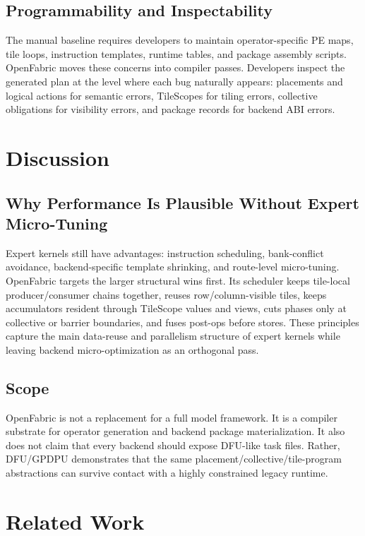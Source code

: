 \documentclass[conference]{IEEEtran}
\newcommand{\systemname}{OpenFabric}
\newcommand{\targetbackend}{DFU/GPDPU}
\begin{document}
\subsection{Programmability and Inspectability}

The manual baseline requires developers to maintain operator-specific PE maps,
tile loops, instruction templates, runtime tables, and package assembly scripts.
\systemname{} moves these concerns into compiler passes. Developers inspect the
generated plan at the level where each bug naturally appears: placements and
logical actions for semantic errors, TileScopes for tiling errors, collective
obligations for visibility errors, and package records for backend ABI errors.

\section{Discussion}

\subsection{Why Performance Is Plausible Without Expert Micro-Tuning}

Expert kernels still have advantages: instruction scheduling, bank-conflict
avoidance, backend-specific template shrinking, and route-level micro-tuning.
\systemname{} targets the larger structural wins first. Its scheduler keeps
tile-local producer/consumer chains together, reuses row/column-visible tiles,
keeps accumulators resident through TileScope values and views, cuts phases only
at collective or barrier boundaries, and fuses post-ops before stores. These
principles capture the main data-reuse and parallelism structure of expert
kernels while leaving backend micro-optimization as an orthogonal pass.

\subsection{Scope}

\systemname{} is not a replacement for a full model framework. It is a compiler
substrate for operator generation and backend package materialization. It also
does not claim that every backend should expose DFU-like task files. Rather,
\targetbackend{} demonstrates that the same placement/collective/tile-program
abstractions can survive contact with a highly constrained legacy runtime.

\section{Related Work}
\end{document}
